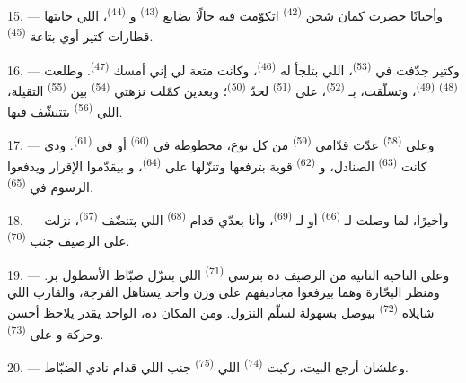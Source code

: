 15. --- وأحيانًا حضرت كمان شحن  \textsuperscript{(42)} اتكوّمت فيه حالًا
بضايع  \textsuperscript{(43)} و \textsuperscript{(44)}،
اللي جابتها قطارات كتير أوي بتاعة  \textsuperscript{(45)}.

\VUsaut{3.0mm}
\VUsaut{3.0mm}

16. --- وكتير جدّفت في  \textsuperscript{(53)}، اللي بتلجأ له
 \textsuperscript{(46)}، وكانت متعة لي إني أمسك 
\textsuperscript{(47)}. وطلعت  \textsuperscript{(48)} 
\textsuperscript{(49)}، وتسلّقت، بـ \textsuperscript{(52)}، على
 \textsuperscript{(51)} لحدّ  \textsuperscript{(50)}؛
وبعدين كمّلت نزهتي  \textsuperscript{(54)} بين  \textsuperscript{(55)} التقيلة، اللي  \textsuperscript{(56)}
بتتنشّف فيها.

17. --- وعلى  \textsuperscript{(58)} عدّت قدّامي 
\textsuperscript{(59)} من كل نوع، محطوطة في  \textsuperscript{(60)} أو
في  \textsuperscript{(61)}. ودي كانت  \textsuperscript{(63)}
الصنادل، و \textsuperscript{(62)} قوية بترفعها وتنزّلها على
 \textsuperscript{(64)}، و بيقدّموا الإقرار
ويدفعوا الرسوم في  \textsuperscript{(65)}.

18. --- وأخيرًا، لما وصلت لـ \textsuperscript{(66)} أو
لـ \textsuperscript{(69)}، وأنا بعدّي قدام 
\textsuperscript{(68)} اللي بتنضّف  \textsuperscript{(67)}، نزلت على
الرصيف جنب  \textsuperscript{(70)}.

19. --- وعلى الناحية التانية من الرصيف ده بترسي 
\textsuperscript{(71)} اللي بتنزّل ضبّاط الأسطول بر. ومنظر البحّارة وهما بيرفعوا
مجاديفهم على وزن واحد يستاهل الفرجة، والقارب اللي شايلاه 
\textsuperscript{(72)} بيوصل بسهولة لسلّم النزول. ومن المكان ده، الواحد يقدر يلاحظ
أحسن  وحركة  و على
 \textsuperscript{(73)}.

\VUsaut{3.0mm}
\VUsaut{3.0mm}

20. --- وعلشان أرجع البيت، ركبت  \textsuperscript{(74)} اللي
 \textsuperscript{(75)} جنب  اللي قدام نادي الضبّاط.

